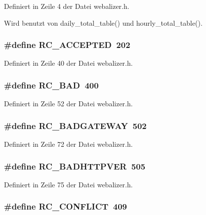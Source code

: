 Definiert in Zeile 4 der Datei webalizer.h.

Wird benutzt von daily\_\-total\_\-table() und hourly\_\-total\_\-table().
\subsubsection{\setlength{\rightskip}{0pt plus 5cm}\#define RC\_\-ACCEPTED~202}\label{webalizer_8h_1dc4c23d4b1d53e2c441c8f0be4a6c8f}




Definiert in Zeile 40 der Datei webalizer.h.
\subsubsection{\setlength{\rightskip}{0pt plus 5cm}\#define RC\_\-BAD~400}\label{webalizer_8h_fe7364776d74e37117c140dd2a57120d}




Definiert in Zeile 52 der Datei webalizer.h.
\subsubsection{\setlength{\rightskip}{0pt plus 5cm}\#define RC\_\-BADGATEWAY~502}\label{webalizer_8h_1d6c4fd6c60fc320baee08a960890fc3}




Definiert in Zeile 72 der Datei webalizer.h.
\subsubsection{\setlength{\rightskip}{0pt plus 5cm}\#define RC\_\-BADHTTPVER~505}\label{webalizer_8h_97071445bafc08e42f84edfb030bd18e}




Definiert in Zeile 75 der Datei webalizer.h.
\subsubsection{\setlength{\rightskip}{0pt plus 5cm}\#define RC\_\-CONFLICT~409}\label{webalizer_8h_de706652b6ba7c52ded58b8945282a10}




